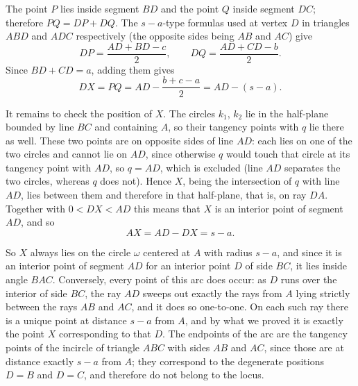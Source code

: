 {    The point $P$ lies inside segment $BD$ and the point $Q$ inside segment $DC$; therefore $PQ = DP + DQ$. The $s-a$-type formulas used at vertex $D$ in triangles $ABD$ and $ADC$ respectively (the opposite sides being $AB$ and $AC$) give
    $$
    DP = \frac{AD + BD - c}{2}, \qquad DQ = \frac{AD + CD - b}{2}.
    $$
    Since $BD + CD = a$, adding them gives
    $$
    DX = PQ = AD - \frac{b + c - a}{2} = AD - (s - a).
    $$

    It remains to check the position of $X$. The circles $k_1$, $k_2$ lie in the half-plane bounded by line $BC$ and containing $A$, so their tangency points with $q$ lie there as well. These two points are on opposite sides of line $AD$: each lies on one of the two circles and cannot lie on $AD$, since otherwise $q$ would touch that circle at its tangency point with $AD$, so $q = AD$, which is excluded (line $AD$ separates the two circles, whereas $q$ does not). Hence $X$, being the intersection of $q$ with line $AD$, lies between them and therefore in that half-plane, that is, on ray $DA$. Together with $0 < DX < AD$ this means that $X$ is an interior point of segment $AD$, and so
    $$
    AX = AD - DX = s - a.
    $$

    So $X$ always lies on the circle $\omega$ centered at $A$ with radius $s - a$, and since it is an interior point of segment $AD$ for an interior point $D$ of side $BC$, it lies inside angle $BAC$. Conversely, every point of this arc does occur: as $D$ runs over the interior of side $BC$, the ray $AD$ sweeps out exactly the rays from $A$ lying strictly between the rays $AB$ and $AC$, and it does so one-to-one. On each such ray there is a unique point at distance $s - a$ from $A$, and by what we proved it is exactly the point $X$ corresponding to that $D$. The endpoints of the arc are the tangency points of the incircle of triangle $ABC$ with sides $AB$ and $AC$, since those are at distance exactly $s - a$ from $A$; they correspond to the degenerate positions $D = B$ and $D = C$, and therefore do not belong to the locus.
}


